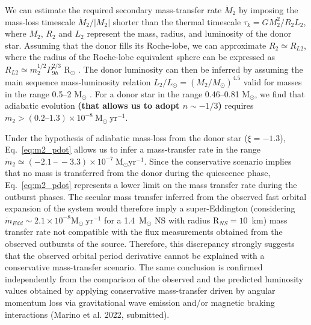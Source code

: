 \documentclass[fleqn,usenatbib]{mnras}
\begin{document}
We can estimate the required secondary mass-transfer rate $\dot{M}_2$ by imposing the mass-loss timescale $\dot{M}_2/|M_2|$ shorter than the thermal timescale $\tau_k=GM_2^2/R_2L_2$, where $M_2$, $R_2$ and $L_2$ represent the mass, radius, and luminosity of the donor star. Assuming that the donor fills its Roche-lobe, we can approximate $R_2\simeq R_{L2}$, where the radius of the Roche-lobe equivalent sphere can be expressed as $R_{L2}\simeq m_2^{1/2} P_{9h}^{2/3}$ R$_\odot$ \citep[obtained by combining Paczy\'nski's Roche-lobe analytic approximation with Kepler's third law;][]{Paczynski71}. The donor luminosity can then be inferred by assuming the main sequence mass-luminosity relation $L_2/L_{\odot}=(M_2/M_{\odot})^{4.5}$ valid for masses in the range 0.5--2 M$_\odot$ \citep{Chabrier:2009vh}. For a donor star in the range 0.46--0.81 M$_\odot$, we find that adiabatic evolution \textbf{(that allows us to adopt $n\sim-1/3$)} requires $\dot{m}_2>(0.2\mbox{--}1.3)\times 10^{-8}~\text{M}_{\odot}~\text{yr}^{-1}$.

Under the hypothesis of adiabatic mass-loss from the donor star ($\xi=-1.3$), Eq.~\ref{eq:m2_pdot} allows us to infer a mass-transfer rate in the range $\dot{m}_{2}\simeq(-2.1 ~\mbox{--}~ -3.3)\times 10^{-7}~\text{M}_{\odot} \text{yr}^{-1}$. Since the conservative scenario implies that no mass is transferred from the donor during the quiescence phase, Eq.~\ref{eq:m2_pdot} represents a lower limit on the mass transfer rate during the outburst phases. The secular mass transfer inferred from the observed fast orbital expansion of the system would therefore imply a super-Eddington (considering $\dot{m}_{Edd}\sim2.1\times 10^{-8} \text{M}_{\odot}~\text{yr}^{-1}$ for a 1.4~$\text{M}_{\odot}$ NS with radius $\text{R}_{NS}=10$~km) mass transfer rate not compatible with the flux measurements obtained from the observed outbursts of the source. Therefore, this discrepancy strongly suggests that the observed orbital period derivative cannot be explained with a conservative mass-transfer scenario. The same conclusion is confirmed independently from the comparison of the observed and the predicted luminosity values obtained by applying conservative mass-transfer driven by angular momentum loss via gravitational wave emission and/or magnetic braking interactions (Marino et al. 2022, submitted).


\end{document}

